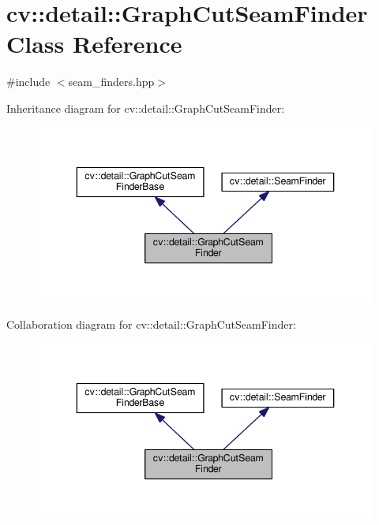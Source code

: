 \hypertarget{classcv_1_1detail_1_1GraphCutSeamFinder}{\section{cv\-:\-:detail\-:\-:Graph\-Cut\-Seam\-Finder Class Reference}
\label{classcv_1_1detail_1_1GraphCutSeamFinder}
}


{\ttfamily \#include $<$seam\-\_\-finders.\-hpp$>$}



Inheritance diagram for cv\-:\-:detail\-:\-:Graph\-Cut\-Seam\-Finder\-:\nopagebreak
\begin{figure}[H]
\begin{center}
\leavevmode
\includegraphics[width=343pt]{classcv_1_1detail_1_1GraphCutSeamFinder__inherit__graph}
\end{center}
\end{figure}


Collaboration diagram for cv\-:\-:detail\-:\-:Graph\-Cut\-Seam\-Finder\-:\nopagebreak
\begin{figure}[H]
\begin{center}
\leavevmode
\includegraphics[width=343pt]{classcv_1_1detail_1_1GraphCutSeamFinder__coll__graph}
\end{center}
\end{figure}
